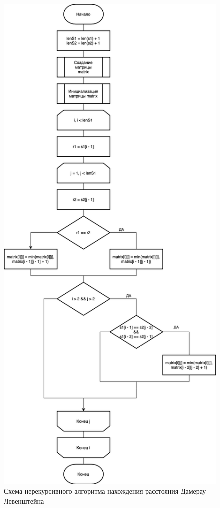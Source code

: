 \begin{figure}[h]
	\centering
	\includegraphics[width=0.65\linewidth]{img/DLM.png}
	\caption{Схема нерекурсивного алгоритма нахождения расстояния Дамерау-Левенштейна}
	\label{fig:mpr}
\end{figure}

\clearpage

